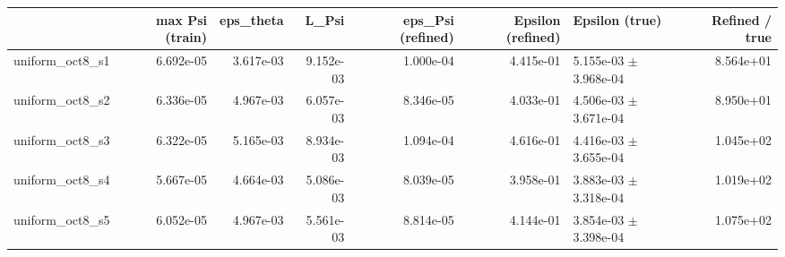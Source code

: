 \begin{tabular}{lrrrrrlr}
\toprule
 & max Psi (train) & eps\_theta & L\_Psi & eps\_Psi (refined) & Epsilon (refined) & Epsilon (true) & Refined / true \\
\midrule
uniform\_oct8\_s1 & 6.692e-05 & 3.617e-03 & 9.152e-03 & 1.000e-04 & 4.415e-01 & 5.155e-03 $\pm$ 3.968e-04 & 8.564e+01 \\
uniform\_oct8\_s2 & 6.336e-05 & 4.967e-03 & 6.057e-03 & 8.346e-05 & 4.033e-01 & 4.506e-03 $\pm$ 3.671e-04 & 8.950e+01 \\
uniform\_oct8\_s3 & 6.322e-05 & 5.165e-03 & 8.934e-03 & 1.094e-04 & 4.616e-01 & 4.416e-03 $\pm$ 3.655e-04 & 1.045e+02 \\
uniform\_oct8\_s4 & 5.667e-05 & 4.664e-03 & 5.086e-03 & 8.039e-05 & 3.958e-01 & 3.883e-03 $\pm$ 3.318e-04 & 1.019e+02 \\
uniform\_oct8\_s5 & 6.052e-05 & 4.967e-03 & 5.561e-03 & 8.814e-05 & 4.144e-01 & 3.854e-03 $\pm$ 3.398e-04 & 1.075e+02 \\
\bottomrule
\end{tabular}
